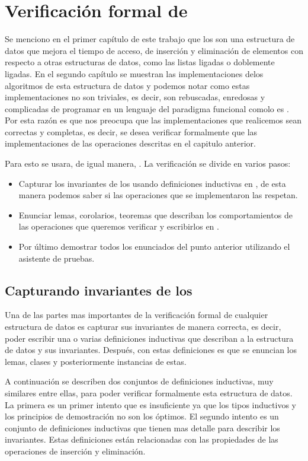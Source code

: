 \chapter{Verificación formal de {\arns}}
Se menciono en el primer cap\'itulo de este trabajo que los {\arns} son una estructura de datos
que mejora el tiempo de acceso, de inserción y eliminación de elementos con respecto a otras
estructuras de datos, como las listas ligadas o doblemente ligadas. En el segundo cap\'itulo se
muestran las implementaciones delos algoritmos de esta  estructura de datos y podemos notar como
estas implementaciones no son triviales, es decir, son rebuscadas, enredosas y complicadas de
programar en un lenguaje del paradigma funcional comolo es {\coq}.
Por esta razón es que nos preocupa que las implementaciones que realicemos sean correctas y
completas, es decir, se desea verificar formalmente que las implementaciones de las operaciones
descritas en el capitulo anterior.

Para esto se usara, de igual manera, {\coq}. La verificaci\'on se divide en varios pasos:
\begin{itemize}
    \item Capturar los invariantes de los {\arns} usando definiciones inductivas en {\coq}, de
    esta manera podemos saber si las operaciones que se implementaron las respetan.
    \item Enunciar lemas, corolarios, teoremas que describan los comportamientos de las
    operaciones que queremos verificar y escribirlos en {\coq}.
    \item Por \'ultimo demostrar todos los enunciados del punto anterior utilizando el asistente
    de pruebas.
\end{itemize}{}

\section{Capturando invariantes de los {\Arns}}
Una de las partes mas importantes de la verificaci\'on formal de cualquier estructura de datos es
capturar sus invariantes de manera correcta, es decir, poder escribir una o varias definiciones
inductivas que describan a la estructura de datos y sus invariantes. Después, con estas
definiciones es que se enuncian los lemas, clases y posteriormente instancias de estas.

A continuaci\'on se describen dos conjuntos de definiciones inductivas, muy similares entre ellas,
para poder verificar formalmente esta estructura de datos. La primera es un primer intento que es
insuficiente ya que los tipos inductivos y los principios de demostraci\'on no son los \'optimos.
El segundo intento es un conjunto de definiciones inductivas que tienen mas detalle para describir
los invariantes. Estas definiciones est\'an relacionadas con las propiedades de las operaciones de
inserci\'on y eliminaci\'on.

